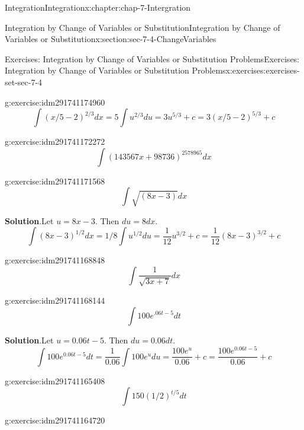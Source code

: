 \documentclass[oneside,10pt,]{book}
\numberwithin{equation}{section}
\begin{document}
\begin{chapterptx}{Integration}{}{Integration}{}{}{x:chapter:chap-7-Intergration}
\begin{sectionptx}{Integration by Change of Variables or Substitution}{}{Integration by Change of Variables or Substitution}{}{}{x:section:sec-7-4-ChangeVariables}
\begin{exercises-subsection}{Exercises: Integration by Change of Variables or Substitution Problems}{}{Exercises: Integration by Change of Variables or Substitution Problems}{}{}{x:exercises:exercises-set-sec-7-4}
\begin{divisionexercise}{3}{}{}{g:exercise:idm291741174960}
%
\begin{equation*}
\int (x/5-2)^{2/3}  dx=5\int {u^{2/3}  du}=3{u^{5/3}}+c
=3{(x/5-2)^{5/3}} +c
\end{equation*}
\end{divisionexercise}%
\begin{divisionexercise}{4}{}{}{g:exercise:idm291741172272}%
%
\begin{equation*}
\int (143567x+98736)^{2578965}  dx 
\end{equation*}
\end{divisionexercise}%
\begin{divisionexercise}{5}{}{}{g:exercise:idm291741171568}%
%
\begin{equation*}
\int \sqrt{(8x-3)}  dx
\end{equation*}
\par\smallskip%
\noindent\textbf{Solution}.\hypertarget{g:solution:idm291741170880}{}\quad{}Let \(u=8x-3\).  Then \(du=8dx\).%
%
\begin{equation*}
\int (8x-3)^{1/2}  dx=1/8 \int {u^{1/2}  du}=\frac{1}{12}{u^{3/2}}+c
=\frac{1}{12}{(8x-3)^{3/2}} +c
\end{equation*}
\end{divisionexercise}%
\begin{divisionexercise}{6}{}{}{g:exercise:idm291741168848}%
%
\begin{equation*}
\int \frac{1}{\sqrt{3x+7}}  dx 
\end{equation*}
\end{divisionexercise}%
\begin{divisionexercise}{7}{}{}{g:exercise:idm291741168144}%
%
\begin{equation*}
\int 100e^{.06t-5}  dt
\end{equation*}
\par\smallskip%
\noindent\textbf{Solution}.\hypertarget{g:solution:idm291741167456}{}\quad{}Let \(u=0.06t-5\).  Then \(du=0.06dt\).%
%
\begin{equation*}
\int 100 e^{0.06t-5}dt
=\frac{1}{0.06} \int {100 e^{u}du}=\frac{100 e^{u}}{0.06}+c
=\frac{100 e^{0.06t-5}}{0.06}+c
\end{equation*}
\end{divisionexercise}%
\begin{divisionexercise}{8}{}{}{g:exercise:idm291741165408}%
%
\begin{equation*}
\int 150(1/2)^{t/5}  dt
\end{equation*}
\end{divisionexercise}%
\begin{divisionexercise}{9}{}{}{g:exercise:idm291741164720}%

\end{divisionexercise}
\end{exercises-subsection}
\end{sectionptx}
\end{chapterptx}
\end{document}

